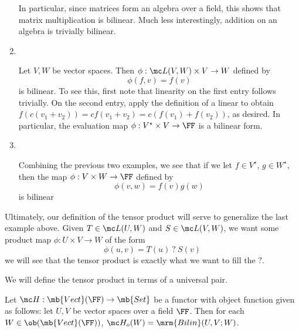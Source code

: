 \documentclass{fkbook}
\theoremstyle{snazzydefinition}
\renewenvironment{example}
  {\pushQED{\oldqed}\renewcommand{\qedsymbol}{$\triangle$}\examplex}
  {\popQED\endexamplex}
\begin{document}
\begin{enumerate}[label=\arabic*.]
\begin{leftbar}
\begin{example}
          In particular, since matrices form an algebra over a field, this
          shows that matrix multiplication is bilinear. Much less
          interestingly, addition on an algebra is trivially bilinear.
        \end{example}
      \end{leftbar}
    \item~\vspace{-1.25em}
      \begin{leftbar}\vspace{-1em}
        \begin{example}
          Let $V,W$ be vector spaces. Then $\phi : \mc L(V,W) \times V
          \to W$ defined by
          \[
            \phi(f,v) = f(v)
          \]
          is bilinear. To see this, first note that linearity on the
          first entry follows trivially. On the second entry, apply
          the definition of a linear to obtain $f(c(v_1 + v_2)) =
          cf(v_1 + v_2) = c(f(v_1) + f(v_2))$, as desired. In
          particular, the evaluation map $\phi : V^\star \times V \to
          \FF$ is a bilinear form.
        \end{example}
      \end{leftbar}
    \item~\vspace{-1.25em}
      \begin{leftbar}\vspace{-1em}
        \begin{example}
          Combining the previous two examples, we see that if we let
          $f \in V^\star$, $g \in W^\star$, then the map $\phi : V
          \times W \to \FF$ defined by
          \[
            \phi(v,w) = f(v) g(w)
          \]
          is bilinear
        \end{example}
      \end{leftbar}
  \end{enumerate}
  Ultimately, our definition of the tensor product will serve to
  generalize the last example above. Given $T \in \mc L(U,W)$ and $S
  \in \mc L(V,W)$, we want some product map $\phi : U \times V \to W$
  of the form
  \[
    \phi(u,v) = T(u)\ ?\ S(v)
  \]
  we will see that the tensor product is exactly what we want to fill
  the $?$.



  We will define the tensor product in terms of a universal pair.
  \begin{definition}
    Let $\mc H : \mb{Vect}(\FF) \to \mb{Set}$ be a functor with object
    function given as follows: let $U, V$ be vector spaces over a
    field $\FF$. Then for each $W \in \ob(\mb{Vect}(\FF))$, $\mc
    H_o(W) = \mrm{Bilin}(U, V; W)$.
  \end{definition}
\end{document}

